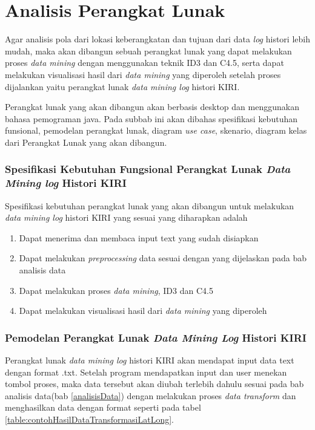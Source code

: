 \section{Analisis Perangkat Lunak}
Agar analisis pola dari lokasi keberangkatan dan tujuan dari data \textsl{log} histori lebih mudah, maka akan dibangun sebuah perangkat lunak yang dapat melakukan proses \textsl{data mining} dengan menggunakan teknik ID3 dan C4.5, serta dapat melakukan visualisasi hasil dari \textsl{data mining} yang diperoleh setelah proses dijalankan yaitu perangkat lunak \textsl{data mining log} histori KIRI. 

Perangkat lunak yang akan dibangun akan berbasis desktop dan menggunakan bahasa pemograman java. Pada subbab ini akan dibahas spesifikasi kebutuhan funsional, pemodelan perangkat lunak, diagram \textsl{use case}, skenario, diagram kelas dari Perangkat Lunak yang akan dibangun.

\subsubsection{Spesifikasi Kebutuhan Fungsional Perangkat Lunak \textsl{Data Mining log} Histori KIRI}
Spesifikasi kebutuhan perangkat lunak yang akan dibangun untuk melakukan \textsl{data mining log} histori KIRI yang sesuai yang diharapkan adalah
\begin{enumerate}
	\item Dapat menerima dan membaca input text yang sudah disiapkan
	\item Dapat melakukan \textsl{preprocessing} data sesuai dengan yang dijelaskan pada bab analisis data
	\item Dapat melakukan proses \textsl{data mining}, ID3 dan C4.5
	\item Dapat melakukan visualisasi hasil dari \textsl{data mining} yang diperoleh
\end{enumerate}

\subsubsection{Pemodelan Perangkat Lunak \textsl{Data Mining Log} Histori KIRI}
Perangkat lunak \textsl{data mining log} histori KIRI akan mendapat input data text dengan format .txt. Setelah program mendapatkan input dan user menekan tombol proses, maka data tersebut akan diubah terlebih dahulu sesuai pada bab analisis data(bab \ref{analisisData}) dengan melakukan proses \textsl{data transform} dan menghasilkan data dengan format seperti pada tabel \ref{table:contohHasilDataTransformasiLatLong}.

